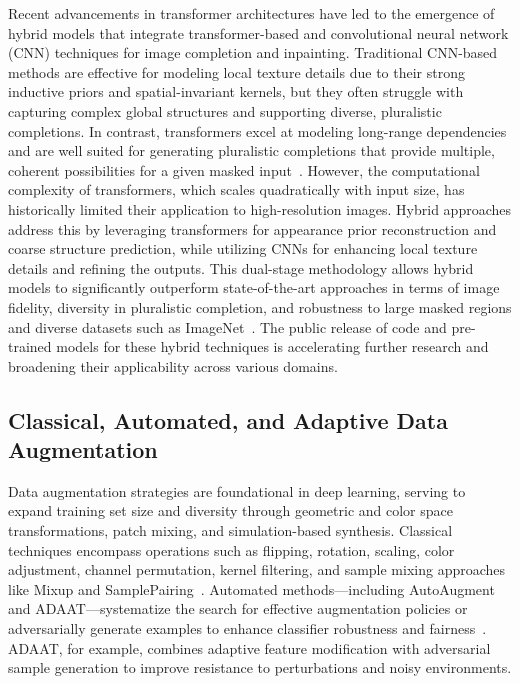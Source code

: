 \documentclass[sigconf]{acmart}
\begin{document}
Recent advancements in transformer architectures have led to the emergence of hybrid models that integrate transformer-based and convolutional neural network (CNN) techniques for image completion and inpainting. Traditional CNN-based methods are effective for modeling local texture details due to their strong inductive priors and spatial-invariant kernels, but they often struggle with capturing complex global structures and supporting diverse, pluralistic completions. In contrast, transformers excel at modeling long-range dependencies and are well suited for generating pluralistic completions that provide multiple, coherent possibilities for a given masked input~\cite{ref92}. However, the computational complexity of transformers, which scales quadratically with input size, has historically limited their application to high-resolution images. Hybrid approaches address this by leveraging transformers for appearance prior reconstruction and coarse structure prediction, while utilizing CNNs for enhancing local texture details and refining the outputs. This dual-stage methodology allows hybrid models to significantly outperform state-of-the-art approaches in terms of image fidelity, diversity in pluralistic completion, and robustness to large masked regions and diverse datasets such as ImageNet~\cite{ref92}. The public release of code and pre-trained models for these hybrid techniques is accelerating further research and broadening their applicability across various domains.

\subsection{Classical, Automated, and Adaptive Data Augmentation}

Data augmentation strategies are foundational in deep learning, serving to expand training set size and diversity through geometric and color space transformations, patch mixing, and simulation-based synthesis. Classical techniques encompass operations such as flipping, rotation, scaling, color adjustment, channel permutation, kernel filtering, and sample mixing approaches like Mixup and SamplePairing~\cite{ref54,ref55,ref61,ref64}. Automated methods—including AutoAugment and ADAAT—systematize the search for effective augmentation policies or adversarially generate examples to enhance classifier robustness and fairness~\cite{ref66,ref85}. ADAAT, for example, combines adaptive feature modification with adversarial sample generation to improve resistance to perturbations and noisy environments.
\end{document}
